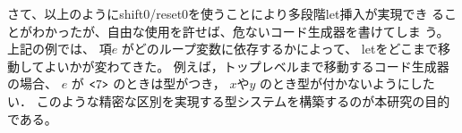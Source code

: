 %
%
%
%
%

さて、以上のようにshift0/reset0を使うことにより多段階let挿入が実現でき
ることがわかったが、自由な使用を許せば、危ないコード生成器を書けてしま
う。上記の例では、
項$e$ がどのループ変数に依存するかによって、
letをどこまで移動してよいかが変わてきた。
例えば，トップレベルまで移動するコード生成器の場合、
$e$ が $\texttt{<}{7}\texttt{>}$ のときは型がつき，
$x$や$y$ のとき型が付かないようにしたい．
このような精密な区別を実現する型システムを構築するのが本研究の目的である。

